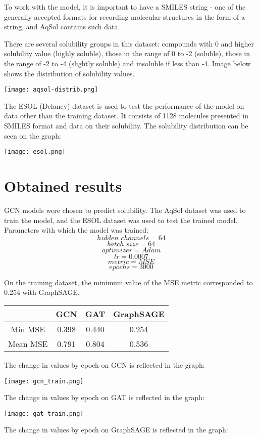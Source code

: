 \documentclass[a4paper,14pt]{article}
\begin{document}
To work with the model, it is important to have a SMILES string - one of the generally accepted formats for recording molecular structures in the form of a string, and AqSol contains such data.

There are several solubility groups in this dataset: compounds with 0 and higher solubility value (highly soluble), those in the range of 0 to -2 (soluble), those in the range of -2 to -4 (slightly soluble) and insoluble if less than -4. Image below shows the distribution of solubility values.

\texttt{[image: aqsol-distrib.png]}

The ESOL (Delaney) dataset is used to test the performance of the model on data other than the training dataset. It consists of 1128 molecules presented in SMILES format and data on their solubility. The solubility distribution can be seen on the graph:

\texttt{[image: esol.png]}

\section{Obtained results} 
GCN models were chosen to predict solubility. The AqSol dataset was used to train the model, and the ESOL dataset was used to test the trained model.
Parameters with which the model was trained:
$$hidden\_channels = 64$$
$$batch\_size = 64$$
$$optimizer = Adam$$
$$lr = 0.0007$$
$$metric = MSE$$
$$epochs = 3000$$

On the training dataset, the minimum value of the MSE metric corresponded to 0.254 with GraphSAGE.
\begin{center}
\begin{tabular}{ |c|c|c|c| }
\hline
  & GCN & GAT & GraphSAGE \\ 
 \hline
 Min MSE & 0.398 & 0.440 & 0.254 \\  
 \hline
 Mean MSE & 0.791 & 0.804 & 0.536   \\
 \hline
\end{tabular}
\end{center}
The change in values by epoch on GCN is reflected in the graph:

\texttt{[image: gcn\_train.png]}

The change in values by epoch on GAT is reflected in the graph:

\texttt{[image: gat\_train.png]}

The change in values by epoch on GraphSAGE is reflected in the graph:
\end{document}
